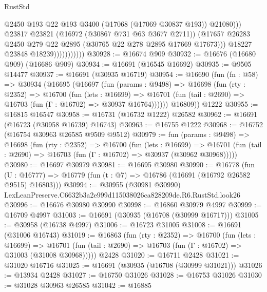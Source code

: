 \begin{lexlean}{RustStd}
\begin{coremodule}
                                  @2450
                                  @193
                                  @22
                                  @193
                                  @3400
                                  (@17068 (@17069 @30837 @193))
                                  @21080)))
                            @23817
                            @23821
                            (@16972 (@30867 @731 @63 @3677 @2711))
                            (@17657
                              @26283
                              @2450
                              @279
                              @22
                              @2895
                              (@30765 @22 @278 @2895 @17669 @17673)))
                          @18227
                          @23848
                          @18239)))))))))))
@30928 := @16674 @909
@30932 := @16676 (@16680 @909) (@16686 @909)
@30934 := @16691 (@16545 @16692)
@30935 := @9505 @14477
@30937 := @16691 (@30935 @16719)
@30954 := @16690
    (fun (fn : @58) =>
    @30934
      (@16695
        (@16697
          (fun (params : @9498) =>
          @16698
            (fun (rty : @2352) =>
            @16700
              (fun (lets : @16699) =>
              @16701 (fun (tail : @2690) => @16703 (fun (Γ : @16702) => @30937 @16764))))))
        @16809))
    @1222
@30955 := @16815 @16547
@30958 := @16731 (@16732 @1222) @26582
@30962 := @16691 (@16723 (@30958 @16739) @16743)
@30963 := @16755 @1222
@30968 := @16752 (@16754 @30963 @26585 @9509 @9512)
@30979 := fun (params : @9498) =>
  @16698
    (fun (rty : @2352) =>
    @16700
      (fun (lets : @16699) =>
      @16701 (fun (tail : @2690) => @16703 (fun (Γ : @16702) => @30937 (@30962 @30968)))))
@30980 := @16697 @30979
@30981 := @16695 @30980
@30990 := @16778
    (fun (U : @16777) => @16779 (fun (t : @7) => @16786 (@16691 (@16792 @26582 @9515) @16803)))
@30994 := @30955 (@30981 @30990) LexLeanPreserve.C6632b3a2e999d115038026ca828209de.R6.RustStd.look26
@30996 := @16676 @30980 @30990
@30998 := @16860 @30979 @4997
@30999 := @16709 @4997
@31003 := @16691 (@30935 (@16708 (@30999 @16717)))
@31005 := @30958 (@16738 @4997)
@31006 := @16723 @31005
@31008 := @16691 (@31006 @16743)
@31019 := @16863
    (fun (rty : @2352) =>
    @16700
      (fun (lets : @16699) =>
      @16701 (fun (tail : @2690) => @16703 (fun (Γ : @16702) => @31003 (@31008 @30968)))))
    @2428
@31020 := @16711 @2428
@31021 := @31020 @16716
@31025 := @16691 (@30935 (@16708 (@30999 @31021)))
@31026 := @13934 @2428
@31027 := @16750 @31026
@31028 := @16753 @31026
@31030 := @31028 @30963 @26585
@31042 := @16885

\end{coremodule}
\end{lexlean}
